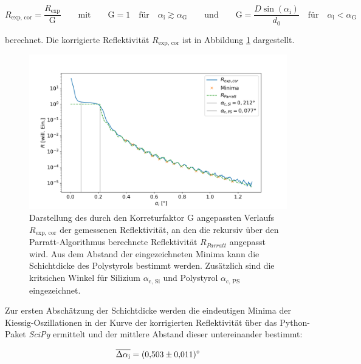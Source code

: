     \begin{equation*}
      R_{\text{exp, cor}} = \frac{R_{\text{exp}}}{\text{G}} \qquad \text{mit} \qquad \text{G}=1 \quad \text{für} \quad \alpha_{\text{i}} \gtrsim \alpha_{\text{G}} \qquad \text{und} \qquad \text{G}=\frac{D\sin\left(\alpha_{\text{i}}\right)}{d_0} \quad \text{für} \quad \alpha_{\text{i}} < \alpha_{\text{G}}
    \end{equation*}

    berechnet. Die korrigierte Reflektivität $R_{\text{exp, cor}}$ ist in Abbildung \ref{fig:Reflektivität} dargestellt. 

    \FloatBarrier
    \begin{figure}[h]
        \centering
        \includegraphics[width = \textwidth]{reflectivity_cor.pdf}
        \caption{Darstellung des durch den Korreturfaktor G angepassten Verlaufs $R_{\text{exp, cor}}$ der gemessenen Reflektivität, an den die rekursiv über den Parratt-Algorithmus berechnete Reflektivität $R_{Parratt}$ angepasst wird. Aus dem Abstand der eingezeichneten Minima kann die Schichtdicke des Polystyrols bestimmt werden. Zusätzlich sind die kritsichen Winkel für Silizium $\alpha_{\text{c, Si}}$ und Polystyrol $\alpha_{\text{c, PS}}$ eingezeichnet.}
        \label{fig:Reflektivität}
      \end{figure}
   
    \FloatBarrier

    Zur ersten Abschätzung der Schichtdicke werden die eindeutigen Minima der Kiessig-Oszillationen in der Kurve der korrigierten Reflektivität über das Python-Paket \textit{SciPy} ermittelt und der 
    mittlere Abstand dieser untereinander bestimmt:
    
    \begin{equation*}
      \overline{\Delta \alpha_{\text{i}}} = \SI{0.503+-0.011}{\degree}
    \end{equation*}
    
